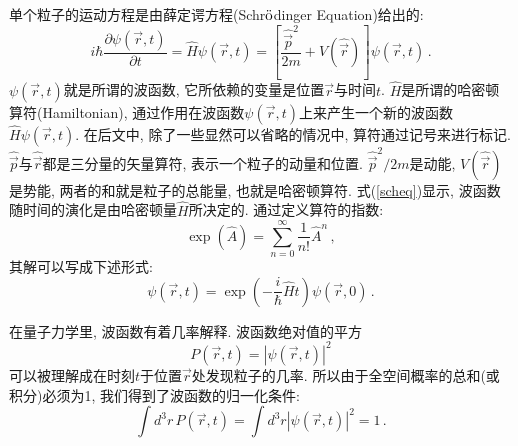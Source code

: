 \documentclass[b5paper]{book}
\begin{document}
单个粒子的运动方程是由薛定谔方程(Schr$\ddot{{\rm o}}$dinger Equation)给出的:
\begin{equation}\label{scheq}
i\hbar\frac{\partial \psi(\vec{r},t)}{\partial t}=\hat{H}\psi(\vec{r},t)=\left[\frac{\hat{\vec{p}}^2}{2m}+V(\hat{\vec{r}})\right]\psi(\vec{r},t)\,.
\end{equation}
$\psi(\vec{r},t)$就是所谓的波函数, 它所依赖的变量是位置$\vec{r}$与时间$t$. $\hat{H}$是所谓的哈密顿算符(Hamiltonian), 通过作用在波函数$\psi(\vec{r},t)$上来产生一个新的波函数$\hat{H}\psi(\vec{r},t)$. 在后文中, 除了一些显然可以省略的情况中, 算符通过$\hat{}$记号来进行标记. $\hat{\vec{p}}$与$\hat{\vec{r}}$都是三分量的矢量算符, 表示一个粒子的动量和位置. $\hat{\vec{p}}^2/2m$是动能, $V(\hat{\vec{r}})$ 是势能, 两者的和就是粒子的总能量, 也就是哈密顿算符. 式(\ref{scheq})显示, 波函数随时间的演化是由哈密顿量$\hat{H}$所决定的. 通过定义算符的指数:
\begin{equation}
\exp(\hat{A})=\sum_{n=0}^\infty\frac{1}{n!}\hat{A}^n\,,
\end{equation}
其解可以写成下述形式:
\begin{equation}
\psi(\vec{r},t)=\exp\left(-\frac{i}{\hbar}\hat{H}t\right)\psi(\vec{r},0)\,.
\end{equation}

在量子力学里, 波函数有着几率解释. 波函数绝对值的平方
\begin{equation}
P(\vec{r},t)=|\psi(\vec{r},t)|^2
\end{equation}
可以被理解成在时刻$t$于位置$\vec{r}$处发现粒子的几率. 所以由于全空间概率的总和(或积分)必须为1, 我们得到了波函数的归一化条件:
\begin{equation}
\int d^3r\,P(\vec{r},t)=\int d^3r|\psi(\vec{r},t)|^2=1\,.
\end{equation}
\end{document}
